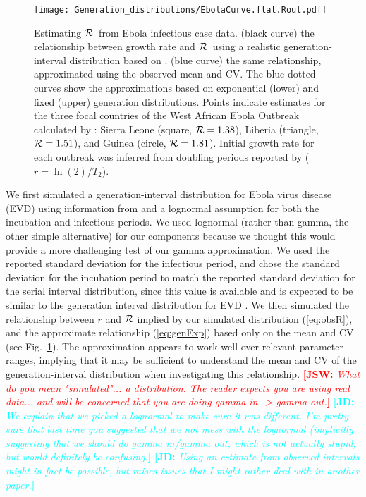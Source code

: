 \documentclass[12pt]{article}
\newcommand{\RR}{\ensuremath{{\cal R}}}
\newcommand{\eref}[1]{(\ref{eq:#1})}
\newcommand{\fref}[1]{Fig.~\ref{fig:#1}}
\newcommand{\comment}[3]{\textcolor{#1}{\textbf{[#2: }\textit{#3}\textbf{]}}}
\newcommand{\jd}[1]{\comment{cyan}{JD}{#1}}
\newcommand{\jsw}[1]{\comment{red}{JSW}{#1}}
\begin{document}
\begin{figure}[htbp] \centering
	\texttt{[image: Generation\_distributions/EbolaCurve.flat.Rout.pdf]}
	\caption{Estimating \RR~from Ebola infectious case data.
(black curve) the relationship between growth rate and \RR~using a realistic generation-interval distribution based on \cite{AylwBarb14}.
(blue curve) the same relationship, approximated using the observed mean and CV. 
The blue dotted curves show the approximations based on exponential (lower) and fixed (upper) generation distributions.
Points indicate estimates for the three focal countries of the West African Ebola Outbreak calculated by \cite{AylwBarb14}: {Sierra Leone (square, $\RR=1.38$), Liberia (triangle, $\RR=1.51$), and Guinea (circle, $\RR=1.81$).} Initial growth rate for each outbreak was inferred from doubling periods reported by \cite{AylwBarb14} ($r = \ln(2)/T_2$).
	\label{fig:EbolaCurve}}
\end{figure}

We first simulated a generation-interval distribution for Ebola virus disease (EVD) using information from \cite{AylwBarb14} and a lognormal assumption for both the incubation and infectious periods.
We used lognormal (rather than gamma, the other simple alternative) for our components because we thought this would provide a more challenging test of our gamma approximation. 
We used the reported standard deviation for the infectious period, and chose the standard deviation for the incubation period to match the reported standard deviation for the serial interval distribution, since this value is available and is expected to be similar to the generation interval distribution for EVD \cite{AylwBarb14}.
We  then simulated the relationship between $r$ and $\RR$ implied by our simulated distribution \eref{obsR}, and the approximate relationship \eref{genExp} based only on the mean and CV (see \fref{EbolaCurve}). The approximation appears to work well over relevant parameter ranges, implying that it may be sufficient to understand the mean and CV of the generation-interval distribution when investigating this relationship.
\jsw{What do you mean "simulated"... a distribution. The reader expects you are using real data... and will be concerned that you are doing gamma in -> gamma out.}
\jd{We explain that we picked a lognormal to make sure it was different. I'm pretty sure that last time you suggested that we not mess with the lognormal (implicitly suggesting that we \emph{should} do gamma in/gamma out, which is not actually stupid, but would definitely be confusing.}
\jd{Using an estimate from observed intervals might in fact be possible, but raises issues that I might rather deal with in another paper.}
\end{document}
